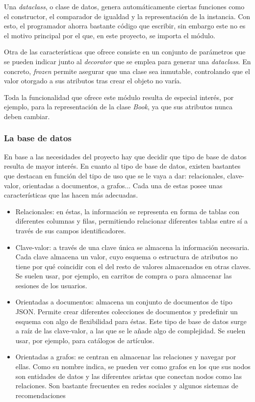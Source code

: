 Una \textit{dataclass}, o clase de datos, genera automáticamente ciertas funciones como el constructor, el comparador de igualdad y la representación de la instancia. Con esto, el programador ahorra bastante código que escribir, sin embargo este no es el motivo principal por el que, en este proyecto, se importa el módulo.

Otra de las características que ofrece consiste en un conjunto de parámetros que se pueden indicar junto al \textit{decorator} que se emplea para generar una \textit{dataclass}. En concreto, \textit{frozen} permite asegurar que una clase sea inmutable, controlando que el valor otorgado a sus atributos tras crear el objeto no varía.

Toda la funcionalidad que ofrece este módulo resulta de especial interés, por ejemplo, para la representación de la clase \textit{Book}, ya que sus atributos nunca deben cambiar.

\subsubsection{La base de datos}

En base a las necesidades del proyecto hay que decidir que tipo de base de datos resulta de mayor interés. En cuanto al tipo de base de datos, existen bastantes que destacan en función del tipo de uso que se le vaya a dar: relacionales, clave-valor, orientadas a documentos, a grafos... Cada una de estas posee unas características que las hacen más adecuadas.

\begin{itemize}
    \item Relacionales: en éstas, la información se representa en forma de tablas con diferentes columnas y filas, permitiendo relacionar diferentes tablas entre sí a través de sus campos identificadores.
    \item Clave-valor: a través de una clave única se almacena la información necesaria. Cada clave almacena un valor, cuyo esquema o estructura de atributos no tiene por qué coincidir con el del resto de valores almacenados en otras claves. Se suelen usar, por ejemplo, en carritos de compra o para almacenar las sesiones de los usuarios.
    \item Orientadas a documentos: almacena un conjunto de documentos de tipo JSON. Permite crear diferentes colecciones de documentos y predefinir un esquema con algo de flexibilidad para éstas. Este tipo de base de datos surge a raíz de las clave-valor, a las que se le añade algo de complejidad. Se suelen usar, por ejemplo, para catálogos de artículos.
    \item Orientadas a grafos: se centran en almacenar las relaciones y navegar por ellas. Como su nombre indica, se pueden ver como grafos en los que sus nodos son entidades de datos y las diferentes aristas que conectan nodos como las relaciones. Son bastante frecuentes en redes sociales y algunos sistemas de recomendaciones
\end{itemize}

